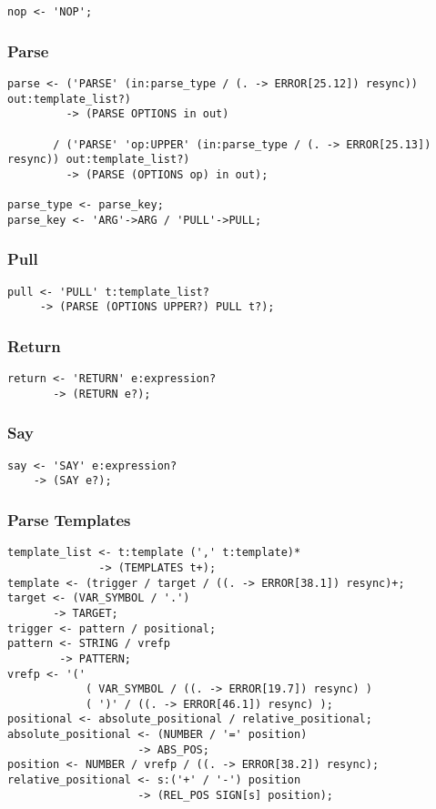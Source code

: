 \begin{verbatim}
nop <- 'NOP';
\end{verbatim}

\subsubsection{Parse}

\begin{verbatim}
parse <- ('PARSE' (in:parse_type / (. -> ERROR[25.12]) resync)) out:template_list?)
         -> (PARSE OPTIONS in out)

       / ('PARSE' 'op:UPPER' (in:parse_type / (. -> ERROR[25.13]) resync)) out:template_list?)
         -> (PARSE (OPTIONS op) in out);

parse_type <- parse_key;
parse_key <- 'ARG'->ARG / 'PULL'->PULL;
\end{verbatim}

\subsubsection{Pull}

\begin{verbatim}
pull <- 'PULL' t:template_list?
     -> (PARSE (OPTIONS UPPER?) PULL t?);
\end{verbatim}

\subsubsection{Return}

\begin{verbatim}
return <- 'RETURN' e:expression?
       -> (RETURN e?);
\end{verbatim}

\subsubsection{Say}

\begin{verbatim}
say <- 'SAY' e:expression?
    -> (SAY e?);
\end{verbatim}

\subsubsection{Parse Templates}

\begin{verbatim}
template_list <- t:template (',' t:template)* 
              -> (TEMPLATES t+);
template <- (trigger / target / ((. -> ERROR[38.1]) resync)+;
target <- (VAR_SYMBOL / '.') 
       -> TARGET;
trigger <- pattern / positional;
pattern <- STRING / vrefp 
        -> PATTERN;
vrefp <- '(' 
            ( VAR_SYMBOL / ((. -> ERROR[19.7]) resync) ) 
            ( ')' / ((. -> ERROR[46.1]) resync) );
positional <- absolute_positional / relative_positional; 
absolute_positional <- (NUMBER / '=' position)
                    -> ABS_POS;
position <- NUMBER / vrefp / ((. -> ERROR[38.2]) resync);
relative_positional <- s:('+' / '-') position
                    -> (REL_POS SIGN[s] position);
\end{verbatim}

